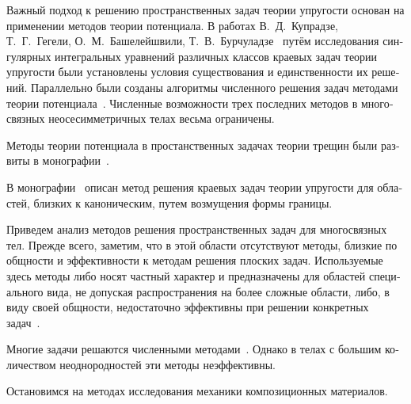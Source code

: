 \begin{russian}
Важный подход к решению пространственных задач теории упругости основан на применении методов теории потенциала. В работах В.~Д.~Купрадзе, Т.~Г.~Гегели, О.~М.~Башелейшвили, Т.~В.~Бурчуладзе~\cite{Kupradze, Burchuladze} путём исследования сингулярных интегральных уравнений различных классов краевых задач теории упругости были установлены условия существования и единственности их решений. Параллельно были созданы алгоритмы численного решения задач методами теории потенциала~\cite{Aleksandrov1973}. Численные возможности трех последних методов в многосвязных неосесимметричных телах весьма ограничены.
 
Методы теории потенциала в простанственных задачах теории трещин были развиты в монографии~\cite{Kit}.
  
В монографии~\cite{Guz1984} описан метод решения краевых задач теории упругости для областей, близких к каноническим, путем возмущения формы границы.

Приведем анализ методов решения пространственных задач для многосвязных тел. Прежде всего, заметим, что в этой области отсутствуют методы, близкие по общности и эффективности к методам решения плоских задач. Используемые здесь методы либо носят частный характер и предназначены для областей специального вида, не допуская распространения на более сложные области, либо, в виду своей общности, недостаточно эффективны при решении конкретных задач~\cite{Chen1978-2, Miyamoto, Sheikh, Strenberg}.

Многие задачи решаются численными методами~\cite{Method, Erzhanov}. Однако в телах с большим количеством неоднородностей эти методы неэффективны.

Остановимся на методах исследования механики композиционных материалов.


\end{russian}
